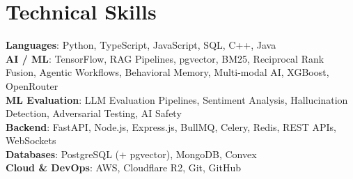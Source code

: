 \documentclass[a4paper,11pt]{article}
\begin{document}
\section{\textbf{Technical Skills}}
 \begin{itemize}[leftmargin=0.05in, label={}]
    \small{\item{
     \textbf{Languages}{: Python, TypeScript, JavaScript, SQL, C++, Java} \\
     \textbf{AI / ML}{: TensorFlow, RAG Pipelines, pgvector, BM25, Reciprocal Rank Fusion, Agentic Workflows, Behavioral Memory, Multi-modal AI, XGBoost, OpenRouter} \\
     \textbf{ML Evaluation}{: LLM Evaluation Pipelines, Sentiment Analysis, Hallucination Detection, Adversarial Testing, AI Safety} \\
     \textbf{Backend}{: FastAPI, Node.js, Express.js, BullMQ, Celery, Redis, REST APIs, WebSockets} \\
     \textbf{Databases}{: PostgreSQL (+ pgvector), MongoDB, Convex} \\
     \textbf{Cloud \& DevOps}{: AWS, Cloudflare R2, Git, GitHub} \\
    }}
 \end{itemize}
\vspace{-8pt}
\end{document}
